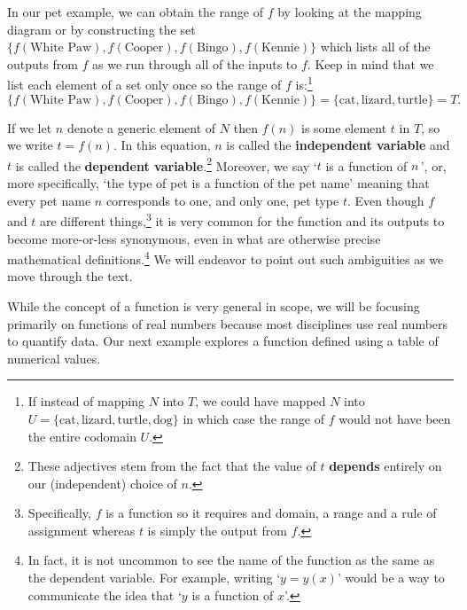 \documentclass{ximera}
\begin{document}
In our pet example, we can obtain the range of $f$  by looking at the mapping diagram or by constructing the set $\{ f(\text{White Paw}), f(\text{Cooper}), f(\text{Bingo}), f(\text{Kennie}) \}$ which lists all of the outputs from $f$ as we run through all of the inputs to $f$.   Keep in mind that we list each element of a set only once so the range of $f$ is:\footnote{If instead of mapping $N$ into $T$, we could have mapped $N$ into $U=\{ \text{cat}, \text{lizard}, \text{turtle}, \text{dog}\}$ in which case the range of $f$ would not have been the entire codomain $U$.}  \[ \{ f(\text{White Paw}), f(\text{Cooper}), f(\text{Bingo}), f(\text{Kennie}) \} = \{ \text{cat}, \text{lizard}, \text{turtle} \} = T.\] 

If we let $n$ denote a generic element of $N$ then $f(n)$ is some element $t$ in $T$, so we write $t = f(n)$.  In this equation, $n$ is called the \textbf{independent variable} and $t$ is called the  \textbf{dependent variable}.\footnote{These adjectives stem from the fact that the value of $t$ \textbf{depends} entirely on our (independent) choice of $n$.}    Moreover, we say `$t$ is a function of $n\,$',  or, more specifically, `the type of pet is a function of the pet name'  meaning that every pet name $n$ corresponds to one, and only one, pet type $t$.   Even though $f$ and $t$ are different things,\footnote{Specifically, $f$ is a function so it requires and domain, a range and a rule of assignment whereas $t$ is simply the output from $f$.} it is very common for the  function and its outputs to become more-or-less synonymous, even in what are otherwise precise mathematical definitions.\footnote{In fact, it is not uncommon to see the name of the function as the same as the dependent variable. For example, writing `$y = y(x)$'  would be a way to communicate the idea that `$y$ is a function of $x$'.}  We will endeavor to point out such ambiguities as we move through the text.

While the concept of a function is very general in scope, we will be focusing primarily on functions of real numbers because most disciplines use real numbers to quantify data.  Our next example explores a function defined using a table of numerical values.
\end{document}
